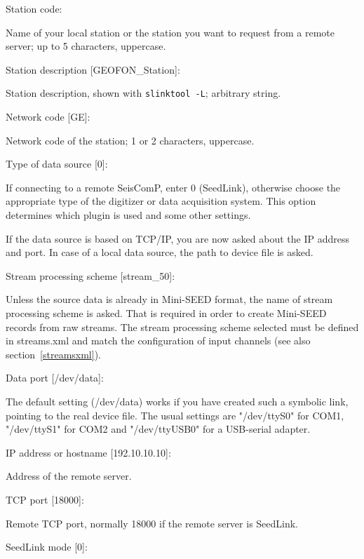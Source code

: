 \documentclass[11pt,a4paper,titlepage]{article}
\begin{document}
\begin{interface}
\item Station code:

Name of your local station or the station you want to request from a
remote server; up to 5 characters, uppercase.

\item Station description [GEOFON_Station]:

Station description, shown with \verb+slinktool -L+; arbitrary string.

\item Network code [GE]:

Network code of the station; 1 or 2 characters, uppercase.

\item Type of data source [0]:

If connecting to a remote SeisComP, enter 0 (SeedLink), otherwise
choose the appropriate type of the digitizer or data acquisition
system. This option determines which plugin is used and some other
settings.

If the data source is based on TCP/IP, you are now asked about the IP
address and port. In case of a local data source, the path to device file
is asked.

\item Stream processing scheme [stream_50]:

Unless the source data is already in Mini-SEED format, the name of stream
processing scheme is asked. That is required in order to create Mini-SEED
records from raw streams. The stream processing scheme selected must be
defined in streams.xml and match the configuration of input channels
(see also section~\ref{streamsxml}).

\item Data port [/dev/data]:

The default setting (/dev/data) works if you have created such a
symbolic link, pointing to the real device file. The usual settings
are "/dev/ttyS0" for COM1, "/dev/ttyS1" for COM2 and "/dev/ttyUSB0"
for a USB-serial adapter.

\item IP address or hostname [192.10.10.10]:

Address of the remote server.

\item TCP port [18000]:

Remote TCP port, normally 18000 if the remote server is SeedLink.

\item SeedLink mode [0]:


\end{interface}
\end{document}
